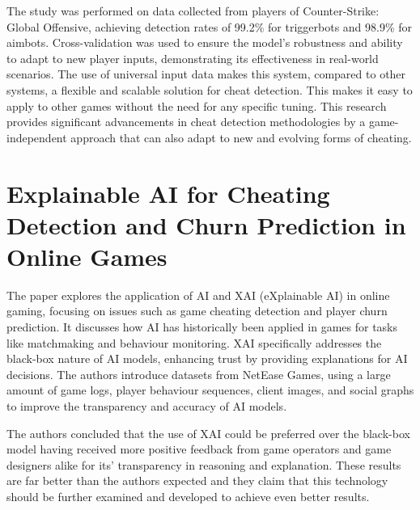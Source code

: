 The study was performed on data collected from players of Counter-Strike: Global Offensive, achieving detection rates of 99.2\% for triggerbots and 98.9\% for aimbots. Cross-validation was used to ensure the model’s robustness and ability to adapt to new player inputs, demonstrating its effectiveness in real-world scenarios. The use of universal input data makes this system, compared to other systems, a flexible and scalable solution for cheat detection. This makes it easy to apply to other games without the need for any specific tuning. This research provides significant advancements in cheat detection methodologies by a game-independent approach that can also adapt to new and evolving forms of cheating.

\section{Explainable AI for Cheating Detection and Churn Prediction in Online Games \cite{tao2022explainable}}

The paper explores the application of AI and XAI (eXplainable AI) in online gaming, focusing on issues such as game cheating detection and player churn prediction. It discusses how AI has historically been applied in games for tasks like matchmaking and behaviour monitoring. XAI specifically addresses the black-box nature of AI models, enhancing trust by providing explanations for AI decisions. The authors introduce datasets from NetEase Games, using a large amount of game logs, player behaviour sequences, client images, and social graphs to improve the transparency and accuracy of AI models.

The authors concluded that the use of XAI could be preferred over the black-box model having received more positive feedback from game operators and game designers alike for its’ transparency in reasoning and explanation. These results are far better than the authors expected and they claim that this technology should be further examined and developed to achieve even better results.
